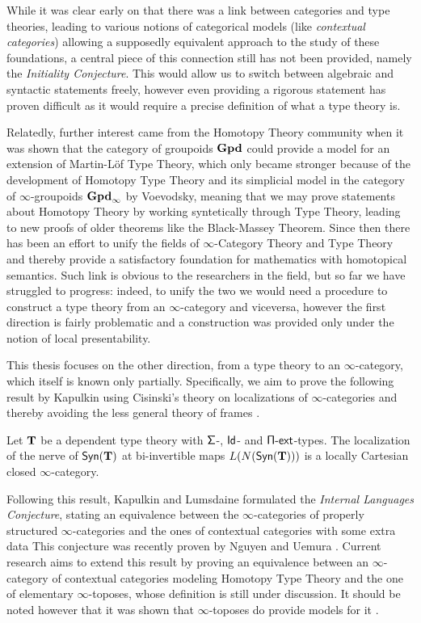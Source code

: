 \noindent
While it was clear early on that there was a link between categories and type
theories, leading to various notions of categorical models (like
\emph{contextual categories}) allowing a supposedly
equivalent approach to the study of these foundations, a central piece of this
connection still has not been provided, namely the \emph{Initiality Conjecture}.
This would allow us to switch between algebraic and syntactic statements freely,
however even providing a rigorous statement has proven difficult as it would
require a precise definition of what a type theory is.

\noindent
Relatedly, further interest came from the Homotopy Theory community when it was
shown that the category of groupoids $\operatorname{\mathbf{Gpd}}$ could provide a model for an
extension of Martin-L{\"o}f Type Theory, which only became stronger because of
the development of
Homotopy Type Theory and its simplicial model in the category of
$\infty$-groupoids $\operatorname{\mathbf{Gpd}_\infty}$ by
Voevodsky, meaning that we may prove statements about Homotopy Theory by working
syntetically through Type Theory, leading to new proofs of older theorems like
the Black-Massey Theorem. Since then there has been an effort to unify the
fields of $\infty$-Category Theory and Type Theory and thereby provide a
satisfactory foundation for mathematics with homotopical semantics. Such link is
obvious to the researchers in the field, but so far we have struggled to
progress: indeed, to unify the two we would need a procedure to construct a type
theory from an $\infty$-category and viceversa, however the first direction is
fairly problematic and a construction was provided only under the notion of
local presentability.

\noindent
This thesis focuses on the other direction, from a type theory to an
$\infty$-category, which itself is known only partially. Specifically, we aim to
prove the following result by Kapulkin \cite[Thm.\ 9.3.17]{Kap14} using
Cisinski's theory on localizations of $\infty$-categories \cite{Cis19} and
thereby avoiding the less general theory of frames \cite{Szu14,KS15}.

\begin{thm}[\ref{finalthm}]
  Let $\operatorname{\mathbf{T}}$ be a dependent type theory with $\operatorname{\mathsf{\Sigma}}$-, $\operatorname{\mathsf{Id}}$- and
  $\operatorname{\mathsf{\Pi-ext}}$-types. The localization of the nerve of $\mathsf{Syn}(\mathbf{T})$ at bi-invertible
  maps $L(N(\mathsf{Syn}(\mathbf{T})))$ is a locally Cartesian closed $\infty$-category.
\end{thm}

\noindent
Following this result, Kapulkin and Lumsdaine formulated the \emph{Internal
Languages Conjecture}, stating an equivalence between the
$\infty$-categories of properly structured $\infty$-categories and the ones of
contextual categories with some extra data
This conjecture
was recently proven by Nguyen and Uemura \cite{NU22}. Current research aims to
extend this result by proving an equivalence between an $\infty$-category of
contextual categories modeling Homotopy Type Theory and the one of elementary
$\infty$-toposes, whose definition is still under discussion. It should be noted
however that it was shown that $\infty$-toposes do provide models for it
\cite{Shu19}.

